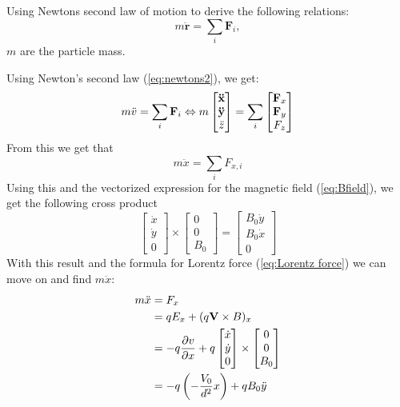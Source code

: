 \documentclass[english,notitlepage,reprint,nofootinbib]{revtex4-1}  %
\begin{document}
	Using Newtons second law of motion to derive the following relations:
	\begin{equation} \label{eq:newtons2}
		m\ddot{\mathbf{r}} = \sum_i \mathbf{F}_i,
	\end{equation}
	$m$ are the particle mass.

	Using Newton’s second law (\ref{eq:newtons2}), we get:
	\begin{equation*}
		m \ddot{v} = \sum_i \vectorbold{F}_i \Leftrightarrow m
		\begin{bmatrix}
			\vectorbold{\ddot{x}} \\
			\vectorbold{\ddot{y}} \\
			\ddot{z}
		\end{bmatrix}
		= \sum_i
		\begin{bmatrix}
			\vectorbold{F}_x \\
			\vectorbold{F}_y \\
			F_z
		\end{bmatrix}
	\end{equation*}
	From this we get that 
	\begin{equation*}
		m \ddot{x} = \sum_i F_{x,i}
	\end{equation*}
	Using this and the vectorized expression for the magnetic field (\ref{eq:Bfield}), we get the following cross product
	\begin{equation*}
		\begin{bmatrix}
			\dot{x} \\
			\dot{y} \\
			0
		\end{bmatrix}
		\times
		\begin{bmatrix}
			0\\
			0 \\
			B_0
		\end{bmatrix}
		=
		\begin{bmatrix}
			B_0 \dot{y} \\
			B_0 \dot{x} \\
			0
		\end{bmatrix}
	\end{equation*}
	With this result and the formula for Lorentz force (\ref{eq:Lorentz force}) we can move on and find $m \ddot{x}$:
	\begin{align*}
		m \ddot{x} &= F_x \\
		&= q E_x + (q \vectorbold{V} \times B)_x \\
		&= -q \frac{\partial v}{\partial x} + q
		\begin{bmatrix}
			\dot{x} \\
			\dot{y} \\
			0
		\end{bmatrix}
		\times
		\begin{bmatrix}
			0 \\
			0 \\
			B_0
		\end{bmatrix} \\
		&= - q \left( - \frac{V_0}{d^2} x \right) + q B_0 \ddot{y} \\
	\end{align*}
\end{document}
